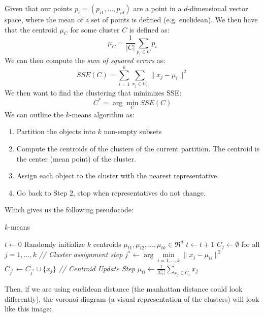     Given that our points $p_i=(p_{i1},\dots,p_{id})$ are a point in a 
    $d$-dimensional vector space, where the mean of a set of points is defined 
    (e.g. euclidean). We then have that the centroid $\mu_C$ for some cluster 
    $C$ is defined as:
    \begin{equation*}
        \mu_C = \frac{1}{|C|} \sum_{p_i\in C}p_i
    \end{equation*}
    We can then compute the \textit{sum of squared errors} as:
    \begin{equation*}
        SSE(C)=\sum_{i=1}^{k}\sum_{x_j\in C_i}\|x_j-\mu_i\|^2
    \end{equation*}
    We then want to find the clustering that minimizes SSE:
    \begin{equation*}
        C^*=\arg\min_C SSE(C)
    \end{equation*}
    We can outline the $k$-means algorithm as:
    \begin{enumerate}
        \item Partition the objects into $k$ non-empty subsets
        \item Compute the centroids of the clusters of the current partition. 
        The centroid is the center (mean point) of the cluster.
        \item Assign each object to the cluster with the nearest representative.
        \item Go back to Step 2, stop when representatives do not change.
    \end{enumerate}
    Which gives us the following pseudocode:
    \begin{algorithm}
        \caption{$k$-means}\label{alg:k-means}
        \begin{algorithmic}
            \State $t \gets 0$
            \State Randomly initialize $k$ centroids 
            $\mu_{t1},\mu_{t2},\dots,\mu_{tk} \in \Re^d$
            \Repeat
                \State $t \gets t+1$
                \State $C_j \gets \emptyset$ for all $j = 1,\dots,k$
                \State \textit{// Cluster assignment step}
                    \State $j^* \gets \arg\min\limits_{i=1,\dots,k} \|x_j - 
                    \mu_{ti}\|^2$
                    \State $C_{j^*} \gets C_{j^*} \cup \{x_j\}$
                \EndFor
                \State \textit{// Centroid Update Step}
                    \State $\mu_{ti} \gets \frac{1}{|C_i|}\sum_{x_j \in C_i} 
                    x_j$
                \EndFor
            \EndProcedure
        \end{algorithmic}
    \end{algorithm}
    Then, if we are using euclidean distance (the manhattan distance could look 
    differently), the voronoi diagram (a visual representation of the clusters) 
    will look like this image:\\
    
